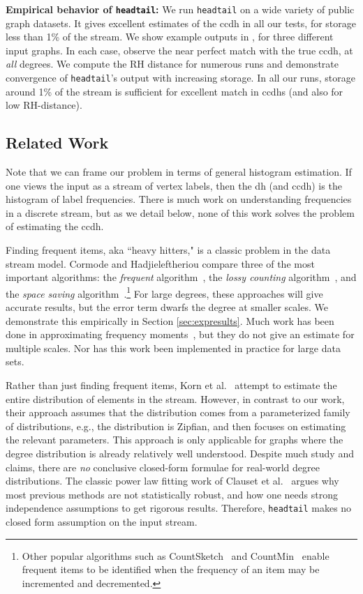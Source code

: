 \documentclass[11pt]{article}
\theoremstyle{definition}
\newcommand{\degdist}{{\tt headtail}}
\begin{document}
\textbf{Empirical behavior of \degdist:} We run \degdist{} on a wide variety of public graph datasets.
It gives excellent estimates of the ccdh in all our tests, for storage less than 1\% of the stream.
We show example outputs in , for three different input graphs. In each case, observe
the near perfect match with the true ccdh, at \emph{all} degrees.
We compute the RH distance for numerous runs and demonstrate convergence of \degdist{}'s output
with increasing storage. In all our runs, storage around 1\% of the stream is sufficient for
excellent match in ccdhs (and also for low RH-distance).



\subsection{Related Work}
\label{sec:relatedwork}
Note that we can frame our problem in terms of general histogram estimation.
If one views the input as a stream of vertex labels, then the dh (and ccdh)
is the histogram of label frequencies. There is much work on understanding frequencies in a discrete
stream, but as we detail below, none of this work solves the problem of estimating the ccdh.

Finding frequent items, aka ``heavy hitters," is a classic problem in the data stream model.
Cormode and Hadjieleftheriou \cite{cormode2008frequent} compare three of the most important algorithms: the
\emph{frequent} algorithm~\cite{demaine2002frequency, karp2003simple,BerindeICS10}, the
\emph{lossy counting} algorithm~\cite{manku2002approximate}, and the \emph{space
saving} algorithm~\cite{metwally2005efficient}.\footnote{Other popular algorithms such as CountSketch~\cite{charikar2002finding} and
CountMin~\cite{cormode2005improved} enable frequent items to be identified when the frequency of an item may be incremented and decremented.}
For large degrees, these approaches will give accurate results, but the error term dwarfs the degree at smaller scales. We demonstrate this empirically in Section \ref{sec:expresults}.
Much work has been done in approximating frequency moments~\cite{AlonMS99,IndykW05,KaneNW10,cormode2008frequent}, but they do not
give an estimate for multiple scales. Nor has this work been implemented in practice for large data sets.

Rather than just finding frequent items, Korn et al.~\cite{korn2006modeling} attempt to estimate the entire distribution of elements in the stream. However, in contrast to our work, their approach assumes that the distribution comes from a parameterized family of distributions, e.g., the distribution is Zipfian, and then focuses on estimating the relevant parameters. This approach is only applicable for graphs where the degree distribution is already relatively well understood.
Despite much study and claims, there are \emph{no} conclusive closed-form formulae for real-world degree distributions.
The classic power law fitting work of Clauset et al.~\cite{ClShNe09} argues why most previous methods are not statistically robust,
and how one needs strong independence assumptions to get rigorous results. Therefore, \degdist{} makes no closed form assumption
on the input stream.
\end{document}
